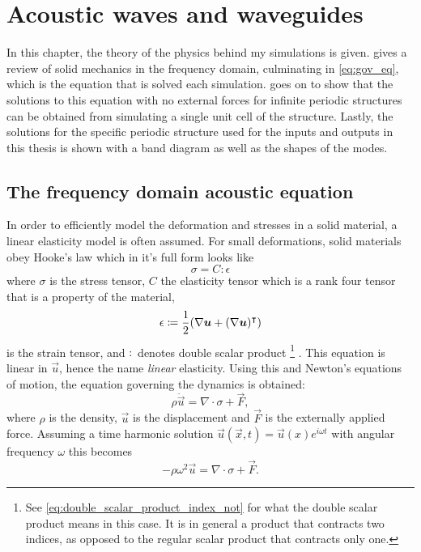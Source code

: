 \chapter{Acoustic waves and waveguides}

In this chapter, the theory of the physics behind my simulations is given.
 gives a review of solid mechanics in the frequency domain,
culminating in \cref{eq:gov_eq}, which is the equation that is solved each
simulation.
 goes on to show that the solutions to this equation with no
external forces for infinite periodic structures can be obtained from simulating
a single unit cell of the structure.
Lastly, the solutions for the specific periodic structure used for the inputs
and outputs in this thesis is shown with a band diagram as well as the shapes of
the modes.

\section{The frequency domain acoustic equation}\label{sec:acoustics}

In order to efficiently model the deformation and stresses in a solid material,
a linear elasticity model is often assumed.
For small deformations, solid materials obey Hooke's law which in it's full form
looks like
\begin{equation}\label{eq:stress}
	\sigma = C : \epsilon
\end{equation}
where $\sigma$ is the stress tensor, $C$ the elasticity tensor which is a
rank four tensor that is a property of the material,
\begin{equation}\label{eq:strain}
	\epsilon \coloneqq \frac12(\nabla \bm u + (\nabla \bm u)^\intercal)
\end{equation}
is the strain tensor, and $:$ denotes double scalar product%
\footnote{%
	See \cref{eq:double_scalar_product_index_not} for what the double scalar
	product means in this case. It is in general a product that contracts two
	indices, as opposed to the regular scalar product that contracts only one.
}%
.
This equation is linear in $\vec u$, hence the name \emph{linear} elasticity.
Using this and Newton's equations of motion, the equation governing the dynamics
is obtained:
\begin{equation}\label{eq:lin_el}
	\rho \ddot{\vec{u}} = \nabla \cdot \sigma + \vec F,
\end{equation}
where $\rho$ is the density, $\vec{u}$ is the displacement and $\vec F$ is the
externally applied force.
Assuming a time harmonic solution
$\vec u(\vec x, t) = \vec u(x) e^{i \omega t}$
with angular frequency $\omega$ this becomes
\begin{equation}\label{eq:lin_el2}
	-\rho \omega^2 \vec{u} = \nabla \cdot \sigma + \vec F.
\end{equation}

